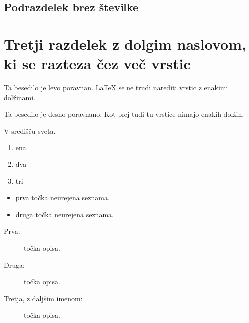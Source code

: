 \documentclass{article}
\begin{document}
\subsection*{Podrazdelek brez številke}
\lipsum[11-13]

\section[Tretji razdelek]{Tretji razdelek z dolgim naslovom, ki se razteza čez več vrstic}
\lipsum[14-15]

\vspace{2cm}


\begin{FlushLeft}
  Ta besedilo je 
  levo poravnan.
  \LaTeX{} se ne trudi narediti
  vrstic z enakimi dolžinami.

  \lipsum[1][1-2]
\end{FlushLeft}

\begin{FlushRight}
  Ta besedilo je desno poravnano.
  Kot prej tudi tu vrstice nimajo
  enakih dolžin.

  \lipsum[1][1-2]
\end{FlushRight}

\begin{Center}
  V središču 
  sveta.

  \lipsum[1][1-2]
\end{Center}

\vspace{2cm}

\noindent 

\begin{enumerate}
  \item ena
  \item dva
  \item tri
\end{enumerate}

\begin{itemize}
  \item prva točka neurejena seznama.
  \item druga točka neurejena seznama.
\end{itemize}

\begin{description}
  \item[Prva:] točka opisa.
  \item[Druga:] točka opisa.
  \item[Tretja, z daljšim imenom:] točka opisa.
\end{description}
\end{document}
